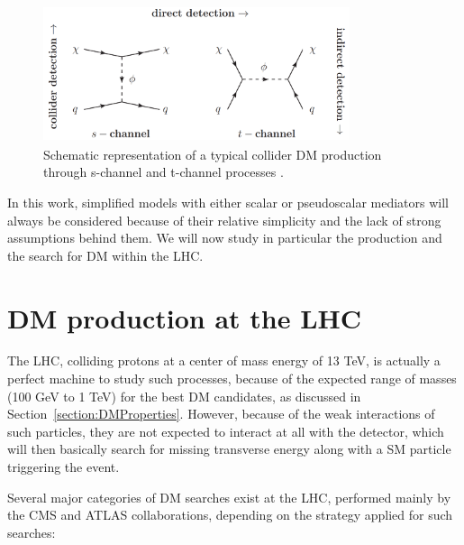 \documentclass[a4paper, 10pt, openright]{report}
\begin{document}
\begin{figure}[htbp]
\begin{center}
\includegraphics[width=9cm, height=4cm]{figs/STChannels.png}
\caption{Schematic representation of a typical collider \ac{DM} production through s-channel and t-channel processes \cite{STChannels}.}
\label{fig:STChannels}
\end{center}
\end{figure}

In this work, simplified models with either scalar or pseudoscalar mediators will always be considered because of their relative simplicity and the lack of strong assumptions behind them. We will now study in particular the production and the search for \ac{DM} within the \ac{LHC}.

\section{\ac{DM} production at the \ac{LHC}} \label{section:ourChannel}

The \acf{LHC}, colliding protons at a center of mass energy of 13 TeV, is actually a perfect machine to study such processes, because of the expected range of masses (100 GeV to 1 TeV) for the best \ac{DM} candidates, as discussed in Section~\ref{section:DMProperties}. However, because of the weak interactions of such particles, they are not expected to interact at all with the detector, which will then basically search for missing transverse energy along with a \ac{SM} particle triggering the event.

Several major categories of \ac{DM} searches exist at the \ac{LHC}, performed mainly by the \ac{CMS} and \ac{ATLAS} collaborations, depending on the strategy applied for such searches:
\end{document}
